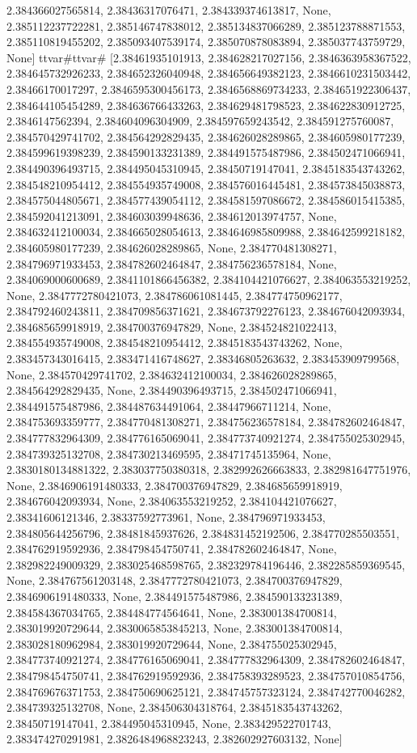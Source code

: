 \documentclass[
  11pt,
  french,
]{article}
\begin{document}
\begin{tcolorbox}[title= Répartition des volumes selon leurs caractéristiques ,colback=boitecode]
2.384366027565814, 2.38436317076471, 2.384339374613817, None, 2.385112237722281, 2.385146747838012, 2.385134837066289, 2.385123788871553, 2.385110819455202, 2.385093407539174, 2.385070878083894, 2.385037743759729, None]
ttvar{#}ttvar{#} [2.38461935101913, 2.384628217027156, 2.3846363958367522, 2.384645732926233, 2.384652326040948, 2.384656649382123, 2.3846610231503442, 2.38466170017297, 2.3846595300456173, 2.3846568869734233, 2.384651922306437, 2.384644105454289, 2.384636766433263, 2.384629481798523, 2.384622830912725, 2.3846147562394, 2.384604096304909, 2.384597659243542, 2.384591275760087, 2.384570429741702, 2.384564292829435, 2.384626028289865, 2.384605980177239, 2.384599619398239, 2.384590133231389, 2.384491575487986, 2.384502471066941, 2.384490396493715, 2.384495045310945, 2.38450719147041, 2.3845183543743262, 2.384548210954412, 2.384554935749008, 2.384576016445481, 2.384573845038873, 2.384575044805671, 2.384577439054112, 2.384581597086672, 2.384586015415385, 2.384592041213091, 2.384603039948636, 2.384612013974757, None, 2.384632412100034, 2.384665028054613, 2.384646985809988, 2.384642599218182, 2.384605980177239, 2.384626028289865, None, 2.384770481308271, 2.384796971933453, 2.384782602464847, 2.384756236578184, None, 2.384069000600689, 2.3841101866456382, 2.384104421076627, 2.384063553219252, None, 2.3847772780421073, 2.384786061081445, 2.384774750962177, 2.384792460243811, 2.384709856371621, 2.384673792276123, 2.384676042093934, 2.384685659918919, 2.384700376947829, None, 2.384524821022413, 2.384554935749008, 2.384548210954412, 2.3845183543743262, None, 2.383457343016415, 2.383471416748627, 2.38346805263632, 2.383453909799568, None, 2.384570429741702, 2.384632412100034, 2.384626028289865, 2.384564292829435, None, 2.384490396493715, 2.384502471066941, 2.384491575487986, 2.384487634491064, 2.38447966711214, None, 2.384753693359777, 2.384770481308271, 2.384756236578184, 2.384782602464847, 2.384777832964309, 2.384776165069041, 2.384773740921274, 2.384755025302945, 2.384739325132708, 2.384730213469595, 2.38471745135964, None, 2.3830180134881322, 2.383037750380318, 2.382992626663833, 2.382981647751976, None, 2.3846906191480333, 2.384700376947829, 2.384685659918919, 2.384676042093934, None, 2.384063553219252, 2.384104421076627, 2.38341606121346, 2.38337592773961, None, 2.384796971933453, 2.384805644256796, 2.38481845937626, 2.384831452192506, 2.384770285503551, 2.384762919592936, 2.384798454750741, 2.384782602464847, None, 2.382982249009329, 2.383025468598765, 2.382329784196446, 2.382285859369545, None, 2.384767561203148, 2.3847772780421073, 2.384700376947829, 2.3846906191480333, None, 2.384491575487986, 2.384590133231389, 2.384584367034765, 2.384484774564641, None, 2.383001384700814, 2.383019920729644, 2.3830065853845213, None, 2.383001384700814, 2.383028180962984, 2.383019920729644, None, 2.384755025302945, 2.384773740921274, 2.384776165069041, 2.384777832964309, 2.384782602464847, 2.384798454750741, 2.384762919592936, 2.384758393289523, 2.384757010854756, 2.384769676371753, 2.384750690625121, 2.384745757323124, 2.384742770046282, 2.384739325132708, None, 2.384506304318764, 2.3845183543743262, 2.38450719147041, 2.384495045310945, None, 2.383429522701743, 2.383474270291981, 2.3826484968823243, 2.382602927603132, None]

\end{tcolorbox}
\end{document}
